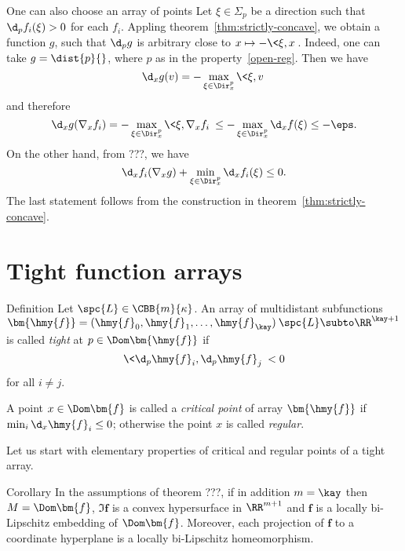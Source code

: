 One can also choose an array of points
Let $\xi\in \Sigma_p$ be a direction such that $\d_pf_i(\xi)>0$ for each $f_i$.
Appling theorem~\ref{thm:strictly-concave}, we obtain a function $g$, 
such that $\d_pg$ is arbitrary close to $x\mapsto -\<\xi,x\>$.
Indeed, one can take $g=\dist{p}{}$, where $p$ as in the property~\ref{open-reg}.
Then we have 
$$\d_x g(v)=-\max_{\xi\in\Dir_x^p}\<\xi,v\>$$
and therefore
$$\d_x g(\nabla_x f_i)
=
-\max_{\xi\in\Dir_x^p}\<\xi,\nabla_x f_i\>
\le
-\max_{\xi\in\Dir_x^p} \d_x f(\xi)
\le
-\eps.$$
On the other hand, from ???, we have
$$\d_x f_i(\nabla_x g)+\min_{\xi\in\Dir_x^p} \d_x f_i(\xi)\le 0.$$
The last statement follows from the construction in
theorem~\ref{thm:strictly-concave}. 
























\section{Tight function arrays}


\begin{thm}{Definition}\label{def:tight} 
Let $\spc{L}\in \CBB{m}{\kappa}$.
An array of multidistant subfunctions $\bm{\hmy{f}}=(\hmy{f}_0,\hmy{f}_1,\dots,\hmy{f}_\kay)\:\spc{L}\subto\RR^{\kay+1}$ 
is called \emph{tight} at $p\in\Dom \bm{\hmy{f}}$ if 
$$\<\d_p\hmy{f}_i,\d_p\hmy{f}_j\><0$$
for all $i\not=j$.

A point $x\in\Dom \bm{f}$ is called a \emph{critical point} of array $\bm{\hmy{f}}$ if $\min_i\d_x \hmy{f}_i\le
0$; 
otherwise the point $x$ is called \emph{regular}.
\end{thm}

Let us start with elementary properties of critical and regular points of a tight array.


 




\begin{thm}{Corollary}\label{cor:conv-chart}
In the assumptions of theorem ???, if in addition $m=\kay$ then
$M=\Dom\bm{f}$, $\Im\bm{f}$ is a convex hypersurface in $\RR^{m+1}$ and $\bm{f}$ is a locally bi-Lipschitz embedding of $\Dom \bm{f}$. 
Moreover, each projection of $\bm{f}$ to a coordinate hyperplane is a locally
bi-Lipschitz homeomorphism.
\end{thm}








